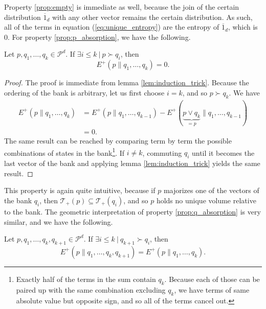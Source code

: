 Property \ref{prop:empty} is immediate as well, because the join of the certain distribution $\overline{1}_d$ with any other vector remains the certain distribution. As such, all of the terms in equation (\ref{eq:unique_entropy}) are the entropy of $\overline{1}_d$, which is 0. For property \ref{prop:p_absorption}, we have the following.

\begin{appendix_lemma}
    Let $p, q_1, \dots, q_k \in \mathcal{P}^d$. If $\exists i \leq k \: | \: p \succ q_i$, then
    \begin{equation}
        E^+(p \parallel q_1, \dots, q_k) = 0.
    \end{equation}
\end{appendix_lemma}

\begin{proof}
    The proof is immediate from lemma \ref{lem:induction_trick}. Because the ordering of the bank is arbitrary, let us first choose $i = k$, and so $p \succ q_k$. We have
    \begin{align}
        E^+(p \parallel q_1, \dots, q_k) &= E^+(p \parallel q_1, \dots, q_{k-1}) - E^+(\underbrace{p \vee q_k}_{= p} \parallel q_1, \dots, q_{k-1})\\
                                         &= 0.
    \end{align}
    The same result can be reached by comparing term by term the possible combinations of states in the bank\footnote{Exactly half of the terms in the sum contain $q_k$. Because each of those can be paired up with the same combination excluding $q_k$, we have terms of same absolute value but opposite sign, and so all of the terms cancel out.}. If $i \neq k$, commuting $q_i$ until it becomes the last vector of the bank and applying lemma \ref{lem:induction_trick} yields the same result. \qedhere
\end{proof}

This property is again quite intuitive, because if $p$ majorizes one of the vectors of the bank $q_i$, then $\mathcal{T}_+(p) \subseteq \mathcal{T}_+(q_i)$, and so $p$ holds no unique volume relative to the bank. The geometric interpretation of property \ref{prop:q_absorption} is very similar, and we have the following.

\begin{appendix_lemma}
    Let $p, q_1, \dots, q_k, q_{k+1} \in \mathcal{P}^d$. If $\exists i \leq k \: | \: q_{k+1} \succ q_i$, then
    \begin{equation}
        E^+(p \parallel q_1, \dots, q_k, q_{k+1}) = E^+(p \parallel q_1, \dots, q_k).
    \end{equation}
\end{appendix_lemma}

